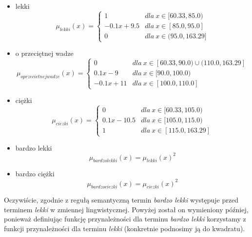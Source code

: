 \documentclass{classrep}
\begin{document}
\begin{enumerate}
\begin{itemize}
        \item lekki
        \begin{equation}
            \mu_{lekki}(x) = \left\{\begin{matrix} 1 & dla \: x\in[60.33, 85.0) \\ -0.1x + 9.5 & dla \: x\in [85.0, 95.0] \\ 0 & dla \: x\in (95.0, 163.29] \end{matrix}\right.
        \end{equation}
         \item o przeciętnej wadze
        \begin{equation}
            \mu_{oprzecietnejwadze}(x) = \left\{\begin{matrix} 0 & dla \: x\in [60.33, 90.0) \cup (110.0, 163.29] \\ 0.1x - 9 & dla \: x\in[90.0, 100.0) \\ -0.1x + 11 & dla \: x\in [100.0, 110.0] \end{matrix}\right.
        \end{equation}
        \item ciężki
        \begin{equation}
            \mu_{ciezki}(x) = \left\{\begin{matrix} 0 & dla \: x\in [60.33, 105.0) \\ 0.1x - 10.5 & dla \: x\in[105.0, 115.0) \\ 1 & dla \: x\in [115.0, 163.29] \end{matrix}\right.
        \end{equation}
        \item bardzo lekki
        \begin{equation}
            \mu_{bardzolekki}(x) = \mu_{lekki}(x)^2
        \end{equation}
        \item bardzo ciężki
        \begin{equation}
            \mu_{bardzociezki}(x) = \mu_{ciezki}(x)^2
        \end{equation}
    \end{itemize}
    Oczywiście, zgodnie z regułą semantyczną termin \textit{bardzo lekki} występuje przed terminem \textit{lekki} w zmiennej lingwistycznej. Powyżej został on wymieniony później, ponieważ definiując funkcję przynależności dla terminu \textit{bardzo lekki} korzystamy z funkcji przynależności dla terminu \textit{lekki} (konkretnie podnosimy ją do kwadratu).
    \begin{figure}[H]

\end{figure}
\end{enumerate}
\end{document}
